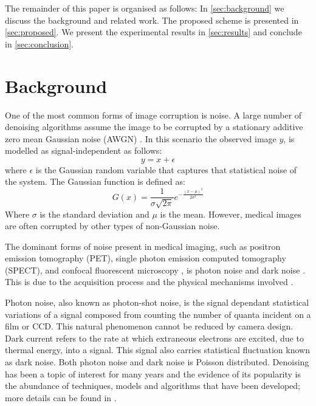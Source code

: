 \documentclass[a4paper,11pt]{ijamas}
\begin{document}
The remainder of this paper is organised as follows: In \autoref{sec:background} we discuss the background and related work. The proposed scheme is presented in \autoref{sec:proposed}. We present the experimental results in \autoref{sec:results} and conclude in \autoref{sec:conclusion}.


\section{Background}
\label{sec:background}
One of the most common forms of image corruption is noise. A large number of denoising algorithms assume the image to be corrupted by a stationary additive zero mean Gaussian noise (AWGN) \cite{rodriguez:2008,le:2005,luiser:2011}. In this scenario the observed image $y$, is modelled as signal-independent as follows:
\begin{equation}
 y = x + \epsilon
\end{equation}
where $\epsilon$ is the Gaussian random variable that captures that statistical noise of the system.
The Gaussian function is defined as:
\begin{equation}
G(x) = \frac{1}{\sigma\sqrt{2\pi}} e^{-\frac{(x-\mu)^2}{2\sigma^2}}
\end{equation}
Where $\sigma$ is the standard deviation and $\mu$ is the mean.
However, medical images are often corrupted by other types of non-Gaussian noise.

The dominant forms of noise present in medical imaging, such as positron emission tomography (PET), single photon emission computed tomography (SPECT), and confocal fluorescent microscopy \cite{rodriguez:2008}, is photon noise and dark noise \cite{luiser:2011,le:2005}. This is due to the acquisition process and the physical mechanisms involved \cite{luiser:2011,le:2005}.

Photon noise, also known as photon-shot noise, is the signal dependant statistical variations of a signal composed from counting the number of quanta incident on a film or CCD. This natural phenomenon cannot be reduced by camera design.
Dark current refers to the rate at which extraneous electrons are excited, due to thermal energy, into a signal. This signal also carries statistical fluctuation known as dark noise.
Both photon noise and dark noise is Poisson distributed.
Denoising has been a topic of interest for many years and the evidence of its popularity is the abundance of techniques, models and algorithms that have been developed; more details can be found in \cite{luiser:2011,luiser:2009,raj:2012,raj2:2012,shinde:2012,raj3:2012,garg:2012}.
\end{document}
